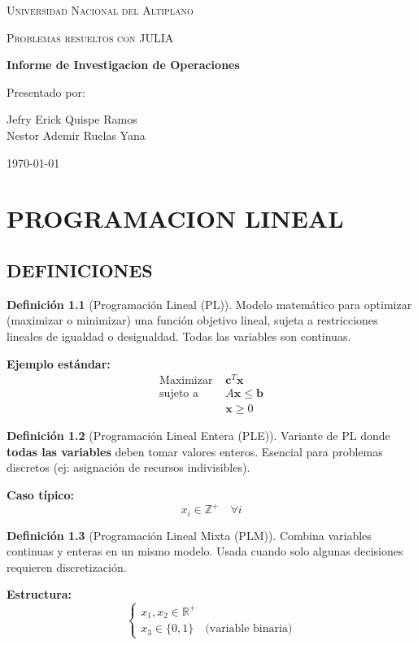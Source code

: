 \documentclass[12pt, a4paper, oneside]{book}
\theoremstyle{definition}
\newtheorem{definicion}{Definición}[chapter]
\newcommand{\portada}{
    \begin{titlepage}
        \centering
        {\scshape\LARGE Universidad Nacional del Altiplano\par}
        \vspace{1.5cm}
        {\scshape\Large Problemas resueltos con JULIA\par}
        \vspace{1.5cm}
        {\huge\bfseries Informe de Investigacion de Operaciones\par}
        \vspace{2cm}
        {\Large Presentado por:\par}
        \vspace{0.5cm}
        {\Large Jefry Erick Quispe Ramos\\
        Nestor Ademir Ruelas Yana}
        \vfill
        {\large \today\par}
    \end{titlepage}
    }
\begin{document}
    \portada
    \tableofcontents
    \newpage


    \chapter{PROGRAMACION LINEAL}

    \section{DEFINICIONES}

    \begin{definicion}[Programación Lineal (PL)]
    Modelo matemático para optimizar (maximizar o minimizar) una función objetivo lineal, sujeta a restricciones lineales de igualdad o desigualdad. Todas las variables son continuas.

    \textbf{Ejemplo estándar:}
    \begin{align*}
    \text{Maximizar } & \mathbf{c}^T\mathbf{x} \\
    \text{sujeto a } & A\mathbf{x} \leq \mathbf{b} \\
    & \mathbf{x} \geq 0
    \end{align*}
    \end{definicion}

    \begin{definicion}[Programación Lineal Entera (PLE)]
    Variante de PL donde \textbf{todas las variables} deben tomar valores enteros. Esencial para problemas discretos (ej: asignación de recursos indivisibles).

    \textbf{Caso típico:}
    \begin{equation*}
    x_i \in \mathbb{Z}^+ \quad \forall i
    \end{equation*}
    \end{definicion}

    \begin{definicion}[Programación Lineal Mixta (PLM)]
    Combina variables continuas y enteras en un mismo modelo. Usada cuando solo algunas decisiones requieren discretización.

    \textbf{Estructura:}
    \begin{equation*}
    \begin{cases}
    x_1, x_2 \in \mathbb{R}^+ \\
    x_3 \in \{0,1\} \quad \text{(variable binaria)}
    \end{cases}
    \end{equation*}
    \end{definicion}
\end{document}
